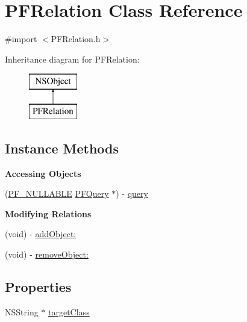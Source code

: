 \hypertarget{interface_p_f_relation}{}\section{P\+F\+Relation Class Reference}
\label{interface_p_f_relation}


{\ttfamily \#import $<$P\+F\+Relation.\+h$>$}

Inheritance diagram for P\+F\+Relation\+:\begin{figure}[H]
\begin{center}
\leavevmode
\includegraphics[height=2.000000cm]{interface_p_f_relation}
\end{center}
\end{figure}
\subsection*{Instance Methods}
\begin{Indent}{\bf Accessing Objects}\par
{\em 

 

 }\begin{DoxyCompactItemize}
\item 
(\hyperlink{_p_f_nullability_8h_a528d97a96c5fb279a45c378f5657fca2}{P\+F\+\_\+\+N\+U\+L\+L\+A\+B\+L\+E} \hyperlink{interface_p_f_query}{P\+F\+Query} $\ast$) -\/ \hyperlink{interface_p_f_relation_a0decdb1a7c7f408c352a92e77b741556}{query}
\end{DoxyCompactItemize}
\end{Indent}
\begin{Indent}{\bf Modifying Relations}\par
{\em 

 

 }\begin{DoxyCompactItemize}
\item 
(void) -\/ \hyperlink{interface_p_f_relation_a4af2f7f8c43502175ab80a8ef174ca7b}{add\+Object\+:}
\item 
(void) -\/ \hyperlink{interface_p_f_relation_a41f3f149b3c8e7d179c74215fcfbfcda}{remove\+Object\+:}
\end{DoxyCompactItemize}
\end{Indent}
\subsection*{Properties}
\begin{DoxyCompactItemize}
\item 
N\+S\+String $\ast$ \hyperlink{interface_p_f_relation_afc9c6cd9b377c4278ed64bcf1091323e}{target\+Class}
\end{DoxyCompactItemize}


